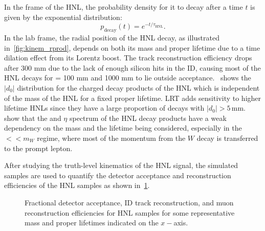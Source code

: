 In the frame of the HNL, the probability density for it to decay after a time $t$ is given by the exponential distribution:
\begin{equation}
    p_\mathrm{decay}(t)=e^{-t/\tau_\mathrm{HNL}}.
\end{equation}
In the lab frame, the radial position of the HNL decay, as illustrated in~\cref{fig:kinem_rprod}, depends on both its mass and proper lifetime due to a time dilation effect from its Lorentz boost. The track reconstruction efficiency drops after 300 mm due to the lack of enough silicon hits in the ID, causing most of the HNL decays for \ctau = 100 mm and 1000 mm to lie outside acceptance.~ shows the $|d_0|$ distribution for the charged decay products of the HNL which is independent of the mass of the HNL for a fixed proper lifetime. LRT adds sensitivity to higher lifetime HNLs since they have a large proportion of decays with $|d_0|>5\,$mm.~ show that the \pT and $\eta$ spectrum of the HNL decay products have a weak dependency on the mass and the lifetime being considered, especially in the \mhnl$<<m_W$ regime, where most of the momentum from the $W$ decay is transferred to the prompt lepton.

After studying the truth-level kinematics of the HNL signal, the simulated samples are used to quantify the detector acceptance and reconstruction efficiencies of the HNL samples as shown in~\cref{fig:acc_and_eff}.

\begin{figure}[!ht]
    \centering
     \caption{Fractional detector acceptance, ID track reconstruction, and muon reconstruction efficiencies for \uuu HNL samples for some representative mass and proper lifetimes indicated on the $x-$axis.}
     \label{fig:acc_and_eff}
 \end{figure}


